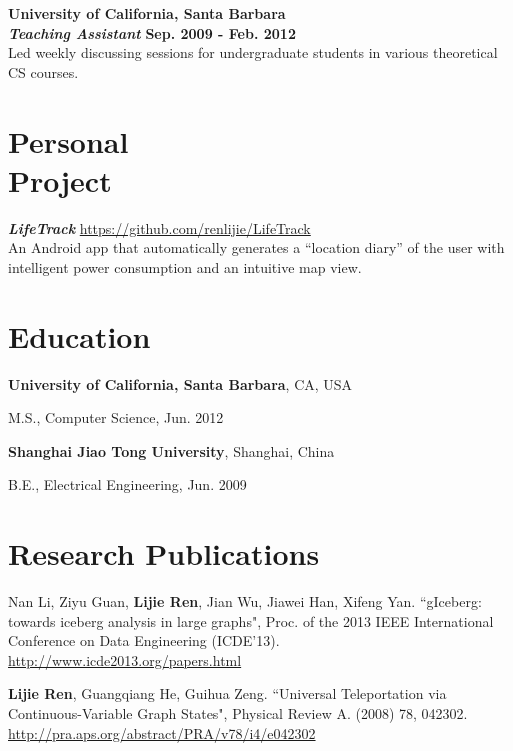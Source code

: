 \documentclass[margin,line]{res}
\newenvironment{list1}{
  \begin{list}{\ding{113}}{%
      \setlength{\itemsep}{0in}
      \setlength{\parsep}{0in} \setlength{\parskip}{0in}
      \setlength{\topsep}{0in} \setlength{\partopsep}{0in}
      \setlength{\leftmargin}{0.17in}}}{\end{list}}
\begin{document}
\begin{resume}
{\bf{University of California, Santa Barbara}}\\
{\bf{\em Teaching Assistant}} \hfill {\bf Sep. 2009 - Feb. 2012}\\
Led weekly discussing sessions for undergraduate students in various theoretical CS courses.

\section{\sc Personal\\Project}
{\bf{\em LifeTrack}} \hfill \url{https://github.com/renlijie/LifeTrack}\\
An Android app that automatically generates a ``location diary'' of the user with intelligent power consumption and an intuitive map view.

\section{\sc Education}
{\bf University of California, Santa Barbara}, CA, USA\\
\vspace*{-.1in}
\begin{list1}
\item[] M.S., Computer Science, Jun. 2012
\end{list1}

{\bf Shanghai Jiao Tong University}, Shanghai, China\\
\vspace*{-.1in}
\begin{list1}
\item[] B.E., Electrical Engineering, Jun. 2009
\end{list1}

\section{\sc Research Publications}
\vspace{-.1cm}
Nan Li, Ziyu Guan, {\bf{Lijie Ren}}, Jian Wu, Jiawei Han, Xifeng Yan. ``gIceberg: towards iceberg analysis in large graphs", Proc. of the 2013 IEEE International Conference on Data Engineering (ICDE'13).\\\url{http://www.icde2013.org/papers.html}

{\bf{Lijie Ren}}, Guangqiang He, Guihua Zeng. ``Universal Teleportation via Continuous-Variable Graph States", Physical Review A. (2008) 78, 042302.\\\url{http://pra.aps.org/abstract/PRA/v78/i4/e042302}


\end{resume}
\end{document}
